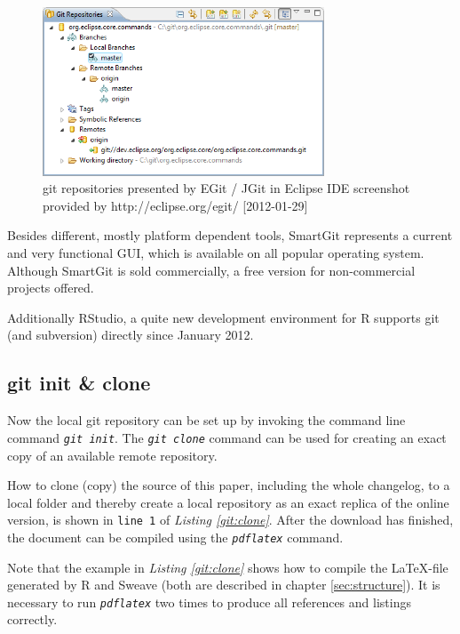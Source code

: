 \documentclass{ifacconf}
\begin{document}
\begin{figure}[h]
\begin{center}
\includegraphics[width=8.4cm]{pics/EGit.png}    %
\caption{git repositories presented by EGit / JGit in Eclipse IDE \newline 
screenshot provided by http://eclipse.org/egit/ [2012-01-29]} 
\label{fig:JGit}
\end{center}
\end{figure}

Besides different, mostly platform dependent tools, 
SmartGit represents a current and very functional GUI, which
is available on all popular operating system. Although SmartGit is sold commercially,
a free version for non-commercial projects offered.

Additionally RStudio, a quite new development environment for R supports git (and subversion)
directly since January 2012.


\subsection{git init \& clone}
Now the local git repository can be set up by invoking the
command line command \textit{\lstinline!git init!}. The \textit{\lstinline!git clone!} 
command can be used for creating an exact copy of an available remote repository.

How to clone (copy) the source of this paper, including the whole changelog, to a local folder 
and thereby create a local repository as an exact replica of the online version,
is shown in \verb|line 1| of \textit{Listing \ref{git:clone}}. After the download has
finished, the document can be compiled using the \textit{\lstinline!pdflatex!} command. 

Note that the example in \textit{Listing \ref{git:clone}} shows how to compile 
the \LaTeX-file generated by R and Sweave (both are described in chapter \ref{sec:structure}).
It is necessary to run \textit{\lstinline!pdflatex!} two times to produce all references and
listings correctly. 
\end{document}
